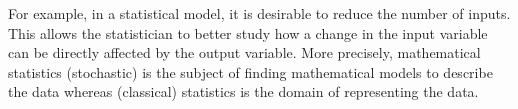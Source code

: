 For example, in a statistical model, it is desirable to reduce the number of inputs. 
This allows the statistician to better study how a change in the input variable can be 
directly affected by the output variable.\cite{gontcharov2019}
More precisely, mathematical statistics (stochastic)\cite{haertler2014statistisch} is the subject of 
finding mathematical models to describe the data 
whereas (classical) statistics is the domain of representing the data. 

